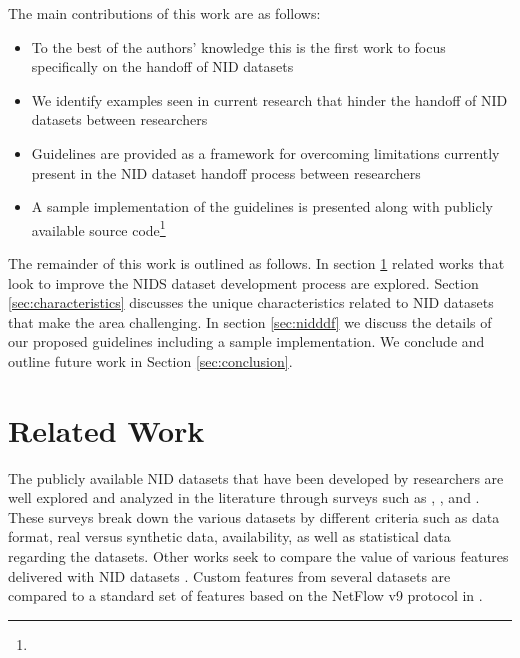 \documentclass[sigconf, anonymous, screen, review]{acmart}
\begin{document}
The main contributions of this work are as follows:

\begin{itemize}
    \item To the best of the authors' knowledge this is the first work to focus specifically on the handoff of NID datasets %
    \item We identify examples seen in current research that hinder the handoff of NID datasets between researchers
    \item Guidelines are provided as a framework for overcoming limitations currently present in the NID dataset handoff process between researchers
    \item A sample implementation of the guidelines is presented along with publicly available source code\footnote{}
\end{itemize}

The remainder of this work is outlined as follows.
In section \ref{sec:related_work} related works that look to improve the NIDS dataset development process are explored.
Section \ref{sec:characteristics} discusses the unique characteristics related to NID datasets that make the area challenging.
In section \ref{sec:nidddf} we discuss the details of our proposed guidelines including a sample implementation.
We conclude and outline future work in Section \ref{sec:conclusion}.

\section{Related Work}\label{sec:related_work}

The publicly available NID datasets that have been developed by researchers are well explored and analyzed in the literature through surveys such as \cite{Chou2022}, \cite{ring2019survey}, and \cite{yang2022systematic}.
These surveys break down the various datasets by different criteria such as data format, real versus synthetic data, availability, as well as statistical data regarding the datasets.
Other works seek to compare the value of various features delivered with NID datasets \cite{7809531}.
Custom features from several datasets are compared to a standard set of features based on the NetFlow v9 protocol \cite{netflowv9format} in \cite{sarhan2020netflow}.
\end{document}
